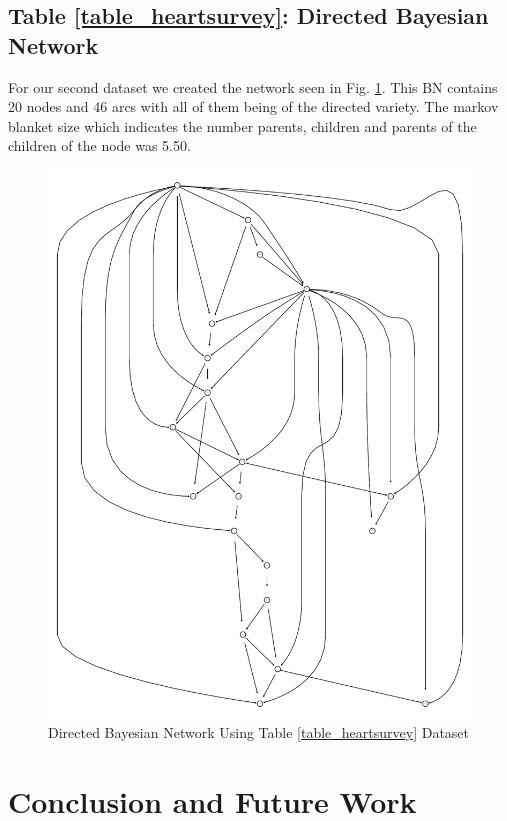 \documentclass[conference]{IEEEtran}
\begin{document}
\subsection*{Table \ref{table_heartsurvey}: Directed Bayesian Network}

For our second dataset we created the network seen in Fig. \ref{fig_heartsurvey}. This BN contains 20 nodes and 46 arcs with all of them being of the directed variety. The markov blanket size which indicates the number parents, children and parents of the children of the node was 5.50. 

\begin{figure}[!ht]
\centering
\includegraphics[width=\textwidth]{bn_heartsurvey.pdf}
\caption{Directed Bayesian Network Using Table \ref{table_heartsurvey} Dataset}
\label{fig_heartsurvey}
\end{figure}

\section{Conclusion and Future Work}

{}





\end{document}
